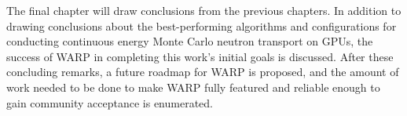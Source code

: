 The final chapter will draw conclusions from the previous chapters.  In addition to drawing conclusions about the best-performing algorithms and configurations for conducting continuous energy Monte Carlo neutron transport on GPUs, the success of WARP in completing this work's initial goals is discussed.  After these concluding remarks, a future roadmap for WARP is proposed, and the amount of work needed to be done to make WARP fully featured and reliable enough to gain community acceptance is enumerated.






